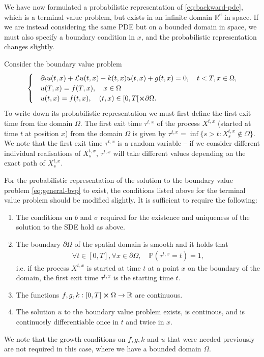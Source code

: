 We have now formulated a probabilistic representation of \autoref{eq:backward-pde}, which is a terminal value problem, but exists in an infinite domain $\mathbb{R^d}$ in space. If we are instead considering the same PDE but on a bounded domain in space, we must also specify a boundary condition in $x$, and the probabilistic representation changes slightly.

Consider the boundary value problem
%
\begin{align}
    \label{eq:general-bvp}
    \begin{cases}
        &\partial_t u(t,x) + \mathcal{L}u(t,x) - k(t,x)u(t,x) + g(t,x) = 0, \quad t<T,x \in \Omega, \\
        &u(T,x) = f(T,x), \quad x \in \Omega \\ 
        &u(t,x) = f(t,x), \quad (t,x) \in [0,T[\cross \partial\Omega.
    \end{cases}
\end{align}
%
To write down its probabilistic representation we must first define the first exit time from the domain $\Omega$. The first exit time $\tau^{t,x}$ of the process $X^{t,x}$ (started at time $t$ at position $x$) from the domain $\Omega$ is given by $\tau^{t,x} = \inf{\{ s > t : X^{t,x}_s \notin \Omega \}}$. We note that the first exit time $\tau^{t,x}$ is a random variable -- if we consider different individual realisations of $X_s^{t,x}$, $\tau^{t,x}$ will take different values depending on the exact path of $X_s^{t,x}$. 

For the probabilistic representation of the solution to the boundary value problem \autoref{eq:general-bvp} to exist, the conditions listed above for the terminal value problem should be modified slightly. It is sufficient to require the following:

\begin{enumerate}
    \item The conditions on $b$ and $\sigma$ required for the existence and uniqueness of the solution to the SDE hold as above.
    \item The boundary $\partial \Omega$ of the spatial domain is smooth and it holds that 
    \begin{align} 
        \forall t \in [0,T], \forall x \in \partial \Omega, \quad \mathbb{P}(\tau^{t,x}=t) = 1, 
    \end{align}
    i.e. if the process $X^{t,x}$ is started at time $t$ at a point $x$ on the boundary of the domain, the first exit time $\tau^{t,x}$ is the starting time $t$.
    \item The functions $f,g,k : [0,T] \cross \Omega \rightarrow \mathbb{R}$ are continuous.
    \item The solution $u$ to the boundary value problem exists, is continous, and is continuosly differentiable once in $t$ and twice in $x$.
\end{enumerate}
We note that the growth conditions on $f,g,k$ and $u$ that were needed previously are not required in this case, where we have a bounded domain $\Omega$.

